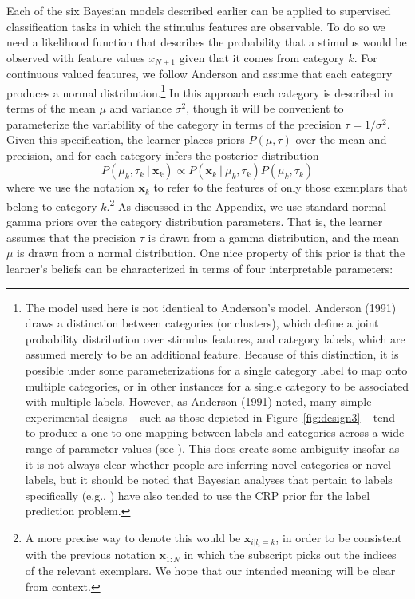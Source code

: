 \documentclass[doc]{apa6}
\newcommand{\given}{\ | \ }
\begin{document}
Each of the six Bayesian models described earlier can be applied to
supervised classification tasks in which the stimulus features are observable. To do so we need a likelihood function that describes the probability that a stimulus would be observed with feature values $x_{N+1}$ given that it comes from category $k$. For continuous valued features, we follow Anderson \citeyear{anderson_adaptive_1991} and assume that each category produces a normal distribution.\footnote{The model used here is not identical to Anderson's model. Anderson (1991) draws a distinction between categories (or clusters), which define a joint probability distribution over stimulus features, and category labels, which are assumed merely to be an additional feature. Because of this distinction, it is possible under some parameterizations for a single category label to map onto multiple categories, or in other instances for a single category to be associated with multiple labels. However, as Anderson (1991) noted, many simple experimental designs -- such as those depicted in Figure~\protect\ref{fig:design3} -- tend to produce a one-to-one mapping between labels and categories across a wide range of parameter values (see ). This does create some ambiguity insofar as it is not always clear whether people are inferring novel categories or novel labels, but it should be noted that Bayesian analyses that pertain to labels specifically (e.g., ) have also tended to use the CRP prior for the label prediction problem.} In this approach each category is described in terms of the mean $\mu$ and variance $\sigma^2$, though it will be convenient to parameterize the variability of the category in terms of the precision $\tau = 1/\sigma^2$. Given this specification, the learner places priors $P(\mu,\tau)$ over the mean and precision, and for each category infers the posterior distribution
\begin{equation}
P(\mu_k,\tau_k \given \bm{x}_k) \propto P(\bm{x}_k \given \mu_k, \tau_k) P(\mu_k, \tau_k)
\end{equation}
where we use the notation $\bm{x}_k$ to refer to the features of only those exemplars that belong to category $k$.\footnote{A more precise way to denote this would be $\bm{x}_{i|l_i=k}$, in order to be consistent with the previous notation $\bm{x}_{1:N}$ in which the subscript picks out the indices of the relevant exemplars. We hope that our intended meaning will be clear from context.} As discussed in the Appendix, we use standard normal-gamma priors over the category distribution parameters. That is, the learner assumes that the precision $\tau$ is drawn from a gamma distribution, and the mean $\mu$ is drawn from a normal distribution. One nice property of this prior is that the learner's beliefs can be characterized in terms of four interpretable parameters:
\end{document}
